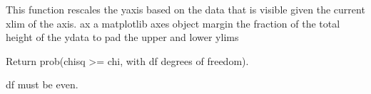 \documentclass[letterpaper,10pt,english]{sphinxmanual}
\begin{document}
\begin{fulllineitems}
\begin{fulllineitems}
\label{\detokenize{classes:classes.pyETM.ETM.autoscale_y}}
\pysigstartsignatures
{}
\pysigstopsignatures
\sphinxAtStartPar
This function rescales the y\sphinxhyphen{}axis based on the data that is visible given the current xlim of the axis.
ax \textendash{} a matplotlib axes object
margin \textendash{} the fraction of the total height of the y\sphinxhyphen{}data to pad the upper and lower ylims

\end{fulllineitems}


\begin{fulllineitems}
\label{\detokenize{classes:classes.pyETM.ETM.chi2inv}}
\pysigstartsignatures
{}
\pysigstopsignatures
\sphinxAtStartPar
Return prob(chisq \textgreater{}= chi, with df degrees of
freedom).

\sphinxAtStartPar
df must be even.

\end{fulllineitems}


\begin{fulllineitems}
\label{\detokenize{classes:classes.pyETM.ETM.display_postseismic_params}}
\pysigstartsignatures
{}
\pysigstopsignatures
\end{fulllineitems}


\begin{fulllineitems}
\label{\detokenize{classes:classes.pyETM.ETM.enable_picking}}
\pysigstartsignatures
{}
\pysigstopsignatures
\end{fulllineitems}


\end{fulllineitems}
\end{document}
